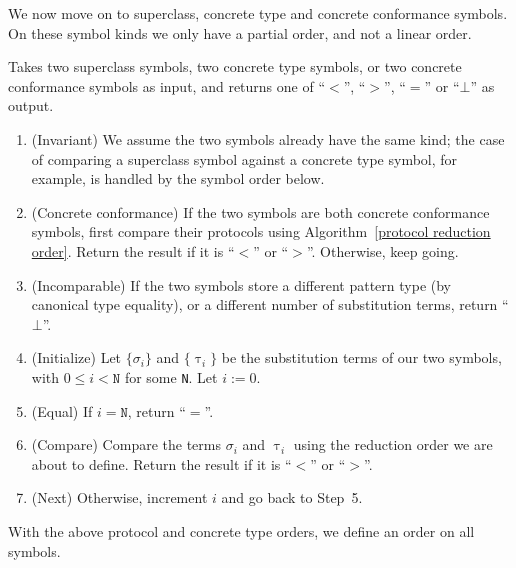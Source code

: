 \documentclass[../generics]{subfiles}
\begin{document}
%
%
We now move on to superclass, concrete type and concrete conformance symbols. On these symbol kinds we only have a partial order, and not a linear order.
%
%
%
%
%
\begin{algorithm}\label{concrete reduction order}
Takes two superclass symbols, two concrete type symbols, or two concrete conformance symbols as input,  and returns one of ``$<$'', ``$>$'', ``$=$'' or \index{$\bot$}``$\bot$'' as output.
\begin{enumerate}
\item (Invariant) We assume the two symbols already have the same kind; the case of comparing a superclass symbol against a concrete type symbol, for example, is handled by the symbol order below.
\item (Concrete conformance) If the two symbols are both concrete conformance symbols, first compare their protocols using Algorithm~\ref{protocol reduction order}. Return the result if it is ``$<$'' or ``$>$''. Otherwise, keep going.
\item (Incomparable) If the two symbols store a different pattern type (by canonical type equality), or a different number of substitution terms, return ``$\bot$''.
\item (Initialize) Let $\{\sigma_i\}$ and $\{\uptau_i\}$ be the substitution terms of our two symbols, with $0\le i<\texttt{N}$ for some \texttt{N}. Let $i:=0$.
\item (Equal) If $i=\texttt{N}$, return ``$=$''.
\item (Compare) Compare the terms $\sigma_i$ and $\uptau_i$ using the reduction order we are about to define. Return the result if it is ``$<$'' or ``$>$''.
\item (Next) Otherwise, increment $i$ and go back to Step~5.
\end{enumerate}
\end{algorithm}
With the above protocol and concrete type orders, we define an order on all symbols.
\end{document}
